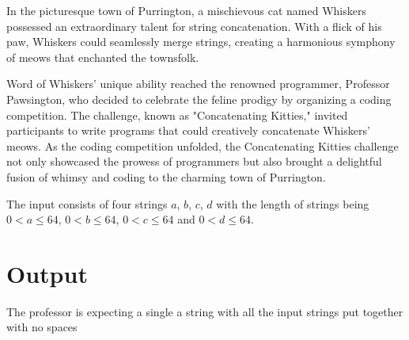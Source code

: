 In the picturesque town of Purrington, a mischievous cat named Whiskers possessed an extraordinary talent for string concatenation. With a flick of his paw, Whiskers could seamlessly merge strings, creating a harmonious symphony of meows that enchanted the townsfolk.

Word of Whiskers' unique ability reached the renowned programmer, Professor Pawsington, who decided to celebrate the feline prodigy by organizing a coding competition. The challenge, known as "Concatenating Kitties," invited participants to write programs that could creatively concatenate Whiskers' meows. As the coding competition unfolded, the Concatenating Kitties challenge not only showcased the prowess of programmers but also brought a delightful fusion of whimsy and coding to the charming town of Purrington.

\begin{Input}
The input consists of four strings $a$, $b$, $c$, $d$ with the length of strings being
$0 < a\leq 64$,
$0 < b\leq 64$, 
$0 < c\leq 64$ and
$0 < d\leq 64$.
\end{Input}

\section*{Output}
The professor is expecting a single a string with all the input strings put together with no spaces
